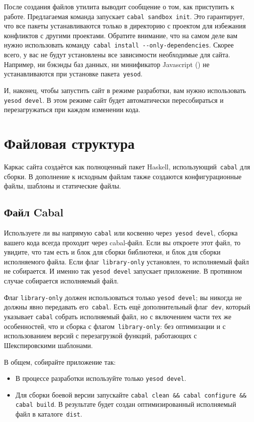 После создания файлов утилита выводит сообщение о том, как приступить к работе.
Предлагаемая команда запускает \texttt{cabal sandbox init}. Это гарантирует,
что все пакеты устанавливаются только в директорию с проектом для избежания конфликтов
с другими проектами. Обратите внимание, что на самом деле вам нужно использовать
команду~\texttt{cabal install -{}-only-dependencies}. Скорее всего, у вас не будут
установлены все зависимости необходимые для сайта. Например, ни бэкэнды
баз данных, ни минификатор Javascript ()
не устанавливаются при установке пакета~\texttt{yesod}.

И, наконец, чтобы запустить сайт в режиме разработки, вам нужно использовать
\texttt{yesod devel}. В этом режиме сайт будет автоматически
пересобираться и перезагружаться при каждом изменении кода.

\section{Файловая структура}
Каркас сайта создаётся как полноценный пакет Haskell,
использующий~\texttt{cabal} для сборки. В дополнение к исходным файлам также
создаются конфигурационные файлы, шаблоны и статические файлы.

\subsection{Файл Cabal}
Используете ли вы напрямую \texttt{cabal} или косвенно через~\texttt{yesod
    devel}, сборка вашего кода всегда проходит через cabal-файл. Если вы
откроете этот файл, то увидите, что там есть и блок для сборки библиотеки, и
блок для сборки исполняемого файла. Если флаг~\texttt{library-only} установлен,
то исполняемый файл не собирается. И именно так \texttt{yesod devel} запускает
приложение.  В противном случае собирается исполняемый файл.

Флаг \texttt{library-only} должен использоваться только \texttt{yesod devel};
вы никогда не должны явно передавать его~\texttt{cabal}. Есть ещё
дополнительный флаг~\texttt{dev}, который указывает \texttt{cabal} собрать
исполняемый файл, но с включением части тех же особенностей, что и сборка с
флагом~\texttt{library-only}: без оптимизации и с использованием версий с
перезагрузкой функций, работающих с Шекспировскими шаблонами.

В общем, собирайте приложение так:
\begin{itemize}
  \item В процессе разработки используйте только \texttt{yesod devel}.
  \item Для сборки боевой версии запускайте \texttt{cabal clean \&\& cabal configure \&\& cabal build}.
    В результате будет создан оптимизированный исполняемый файл в каталоге~\texttt{dist}.
\end{itemize}


